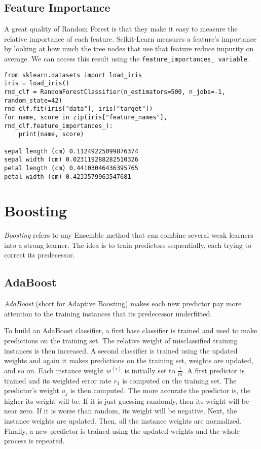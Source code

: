 \documentclass[letterpaper]{article}
\begin{document}
\subsection{Feature Importance}
A great quality of Random Forest is that they make it easy to measure the relative importance of each feature. Scikit-Learn measures a feature's importance by looking at how much the tree nodes that use that feature reduce impurity on average. We can access this result using the \texttt{feature\_importances\_ variable}.

\begin{verbatim}
from sklearn.datasets import load_iris
iris = load_iris()
rnd_clf = RandomForestClassifier(n_estimators=500, n_jobs=-1, random_state=42)
rnd_clf.fit(iris["data"], iris["target"])
for name, score in zip(iris["feature_names"], rnd_clf.feature_importances_):
    print(name, score)

sepal length (cm) 0.11249225099876374
sepal width (cm) 0.023119288282510326
petal length (cm) 0.44103046436395765
petal width (cm) 0.4233579963547681
\end{verbatim}

\section{Boosting} 
\textsl{Boosting} refers to any Ensemble method that can combine several weak learners into a strong learner. The idea is to train predictors sequentially, each trying to correct its predecessor. 

\subsection{AdaBoost} 
\textsl{AdaBoost} (short for Adaptive Boosting) makes each new predictor pay more attention to the training instances that its predecessor underfitted. 

To build an AdaBoost classifier, a first base classifier is trained and used to make predictions on the training set. The relative weight of misclassified training instances is then increased. A second classifier is trained using the updated weights and again it makes predictions on the training set, weights are updated, and so on. Each instance weight $w^{(i)}$ is initially set to $\frac{1}{m}$. A first predictor is trained and its weighted error rate $r_{1}$ is computed on the training set. The predictor's weight $a_{j}$ is then computed. The more accurate the predictor is, the higher its weight will be. If it is just guessing randomly, then its weight will be near zero. If it is worse than random, its weight will be negative. Next, the instance weights are updated. Then, all the instance weights are normalized. Finally, a new predictor is trained using the updated weights and the whole process is repeated. 
\end{document}
